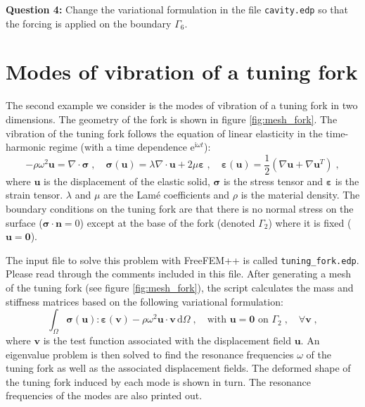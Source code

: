 \documentclass[english,3p]{elsarticle}
\newcommand{\code}[1]{\texttt{#1}}
\newcommand{\ii}{\mathrm{i}}
\newcommand{\ee}{\mathrm{e}}
\newcommand{\dd}{\mathrm{d}}
\begin{document}
\textbf{Question 4:} Change the variational formulation in the file \code{cavity.edp} so that the forcing is applied on the boundary $\Gamma_6$.

\clearpage

\section{Modes of vibration of a tuning fork}

The second example we consider is the modes of vibration of a tuning fork in two dimensions.
The geometry of the fork is shown in figure \ref{fig:mesh_fork}.
The vibration of the tuning fork follows the equation of linear elasticity in the time-harmonic regime (with a time dependence $\ee^{\ii\omega t}$):
\begin{equation}
-\rho\omega^2\mathbf{u} = \nabla\cdot\boldsymbol{\sigma}
\;,\quad
\boldsymbol{\sigma}(\mathbf{u}) = \lambda\nabla\cdot\mathbf{u} + 2\mu\boldsymbol{\varepsilon}
\;,\quad
\boldsymbol{\varepsilon}(\mathbf{u}) = \frac{1}{2}( \nabla\mathbf{u} + \nabla\mathbf{u}^T )
\;,
\label{eq:elasticity}
\end{equation}
where $\mathbf{u}$ is the displacement of the elastic solid, $\boldsymbol{\sigma}$ is the stress tensor and $\boldsymbol{\varepsilon}$ is the strain tensor.
$\lambda$ and $\mu$ are the Lamé coefficients and $\rho$ is the material density.
The boundary conditions on the tuning fork are that there is no normal stress on the surface ($\boldsymbol{\sigma}\cdot\mathbf{n} = 0$) except at the base of the fork (denoted $\Gamma_2$) where it is fixed ($\mathbf{u}=\mathbf{0}$).

The input file to solve this problem with FreeFEM++ is called \code{tuning\_fork.edp}.
Please read through the comments included in this file.
After generating a mesh of the tuning fork (see figure \ref{fig:mesh_fork}), the script calculates the mass and stiffness matrices based on the following variational formulation:
$$
\int_\Omega \boldsymbol{\sigma}(\mathbf{u}):\boldsymbol{\varepsilon}(\mathbf{v}) - \rho\omega^2\mathbf{u}\cdot\mathbf{v}\,\dd\Omega
\;,\quad
\text{with } \mathbf{u}=\mathbf{0} \text{ on } \Gamma_2
\;,\quad
\forall \mathbf{v}
\;,
$$
where $\mathbf{v}$ is the test function associated with the displacement field $\mathbf{u}$.
An eigenvalue problem is then solved to find the resonance frequencies $\omega$ of the tuning fork as well as the associated displacement fields.
The deformed shape of the tuning fork induced by each mode is shown in turn.
The resonance frequencies of the modes are also printed out.
\end{document}
